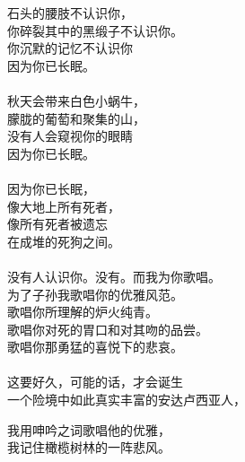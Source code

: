 \documentclass{article}
\begin{document}
\begin{center}
\begin{minipage}{0.5\linewidth}
石头的腰肢不认识你， \\
你碎裂其中的黑缎子不认识你。 \\
你沉默的记忆不认识你 \\
因为你已长眠。 \\
 \\
秋天会带来白色小蜗牛， \\
朦胧的葡萄和聚集的山， \\
没有人会窥视你的眼睛 \\
因为你已长眠。 \\
 \\
因为你已长眠， \\
像大地上所有死者， \\
像所有死者被遗忘 \\
在成堆的死狗之间。 \\
 \\
没有人认识你。没有。而我为你歌唱。 \\
为了子孙我歌唱你的优雅风范。 \\
歌唱你所理解的炉火纯青。 \\
歌唱你对死的胃口和对其吻的品尝。 \\
歌唱你那勇猛的喜悦下的悲哀。 \\
 \\
这要好久，可能的话，才会诞生 \\
一个险境中如此真实丰富的安达卢西亚人， \\

\end{minipage}

\newpage

\begin{minipage}{0.5\linewidth}

\Large

我用呻吟之词歌唱他的优雅， \\
我记住橄榄树林的一阵悲风。\end{minipage}

\end{center}
\end{document}
